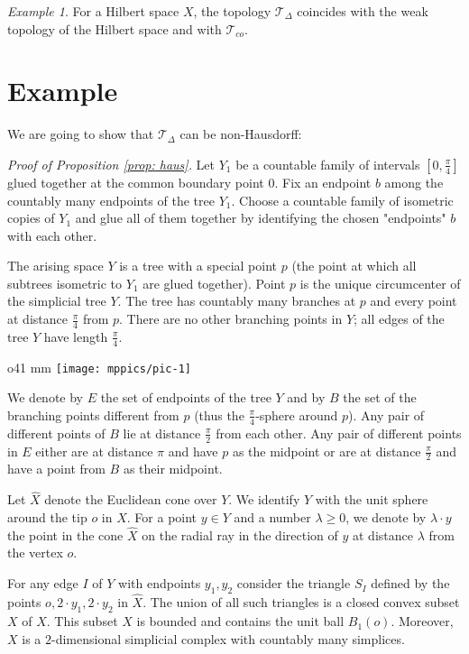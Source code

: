 \documentclass[12pt,leqno]{amsart}
\numberwithin{equation}{section}
\theoremstyle{remark}
\newtheorem{ex}[thm]{Example}
\begin{document}
\begin{ex}
For a Hilbert space $X$, the topology $\mathcal T_{\Delta}$ coincides with the weak topology of the Hilbert space and with $\mathcal T_{co}$. 
\end{ex}

\section{Example} \label{sec: ex}
We are going to show that $\mathcal T_{\Delta}$ can be non-Hausdorff:

\medskip

\noindent\emph{Proof of Proposition \ref{prop: haus}.}
Let $Y_1$ be a countable family of intervals $[0, \frac \pi 4]$ glued together at the common boundary point $0$.
Fix an endpoint $b$ among the countably many endpoints of the tree $Y_1$.
Choose a countable family of isometric copies of $Y_1$ and glue all of them together by identifying the chosen "endpoints" $b$ with each other.

The arising space $Y$ is a tree with a special point $p$ (the point at which all subtrees isometric to $Y_1$ are glued together).
Point $p$ is the unique circumcenter of the simplicial tree $Y$.
The tree has countably many branches at $p$ and every point at distance $\frac \pi 4$ from $p$.
There are no other branching points in $Y$; all edges of the tree $Y$ have length $\frac \pi 4$. 

\begin{wrapfigure}{o}{41 mm}
\centering
\texttt{[image: mppics/pic-1]}
\end{wrapfigure}

We denote by $E$ the set of endpoints of the tree $Y$ and by $B$ the set of the branching points
different from $p$ (thus the $\frac \pi 4$-sphere around $p$).
Any pair of different points of $B$ lie at distance $\frac \pi 2$ from each other. Any pair 
of different points in $E$ either are at distance $\pi$ and have $p$ as the midpoint or are at distance $\frac \pi 2$ and have a point from $B$ as their midpoint. 

Let $\hat X$ denote the Euclidean cone over $Y$. We identify $Y$ with the unit sphere around the tip $o$ in $\hat X$. For a point $y\in Y$ and a number $\lambda \geq 0$, we denote by $\lambda \cdot y$ the point in the cone $\hat X$ on the radial ray in the direction of $y$ at distance $\lambda$ from the vertex $o$. 

For any edge $I$ of $Y$ with endpoints $y_1,y_2$ consider the triangle $S_I$ defined by the points $o, 2\cdot y_1, 2\cdot y_2$ in $\hat X$. The union of all such triangles is a closed convex subset $X$ of $\hat X$. This subset $X$ is bounded and contains the unit ball $B_1(o)$. Moreover, $X$ is a $2$-dimensional simplicial complex with countably many simplices.
\end{document}
